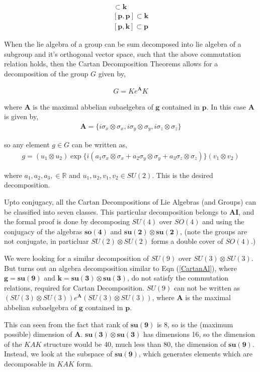 \documentclass{amsart}
\begin{document}
\begin{align*}
    [\mathbf{k},\mathbf{k}] \subset \mathbf{k}\\
    [\mathbf{p},\mathbf{p}] \subset \mathbf{k}\\
    [\mathbf{p},\mathbf{k}] \subset \mathbf{p}
\end{align*}

When the lie algebra of a group can be sum decomposed into lie algebra of a subgroup and it's orthogonal vector space, such that the above commutation relation holds, then the Cartan Decomposition Theorems allows for a  decomposition of the group $G$ given by,

\begin{align*}
    G=K e^{\mathbf{A}}K
\end{align*}

where $\mathbf{A}$ is the maximal abbelian subaelgebra of $\mathbf{g}$ contained in $\mathbf{p}$. In this case $\mathbf{A}$ is given by,
\begin{align}
    \mathbf{A}=\{i \sigma_x \otimes \sigma_x, i \sigma_y \otimes \sigma_y, i \sigma_z \otimes \sigma_z\}
\end{align}

so any element $g \in G$ can be written as,
\begin{align}
    g= (u_1 \otimes u_2) \exp \{ i (a_1\sigma_x \otimes \sigma_x +a_2 \sigma_y \otimes \sigma_y + a_3 \sigma_z \otimes \sigma_z)\}(v_1 \otimes v_2) 
\end{align}

where $a_1,a_2,a_3,\in \mathbb{R}$ and $u_1,u_2,v_1,v_2 \in SU(2)$. This is the desired decomposition.
\par Upto conjugacy, all the Cartan Decompositions of Lie Algebras (and Groups) can be classified into seven classes. This particular decomposition belongs to $\mathbf{A I }$, and the formal proof is done by decomposing $SU(4)$ over $SO(4)$ and using the conjugacy of the algebras $\mathbf{so(4)}$ and $\mathbf{su(2)} \otimes \mathbf{su(2)}$, (note the groups are not conjugate, in particluar $SU(2) \otimes SU(2)$ forms a double cover of $SO(4)$.)

We were looking for a similar decomposition of $SU(9)$ over $SU(3) \otimes SU(3).$ But turns out an algebra decomposition similar to Eqn (\ref{CartanAl}), where $\mathbf{g}=\mathbf{su(9)}$ and $\mathbf{k}=\mathbf{su(3) \otimes su(3)}$, do not satisfy the commutation relations, required for Cartan Decomposition. $SU(9)$ can not be written as $ (SU(3) \otimes SU(3)) e^{\mathbf{A}}(SU(3) \otimes SU(3)) $, where $\mathbf{A}$ is the maximal abbelian subaelgebra of $\mathbf{g}$ contained in $\mathbf{p}$.
\par This can seen from the fact that rank of $\mathbf{su(9)}$ is 8, so is the (maximum possible) dimension of $\mathbf{A}$. $\mathbf{su(3) \otimes su(3)}$ has dimensions 16, so the dimension of the $KAK$ structure would be 40, much less than 80, the dimension of $\mathbf{su(9)}$. Instead, we look at the subspace of $\mathbf{su(9)}$, which generates elements which are decomposable in $KAK$ form. 
\end{document}
